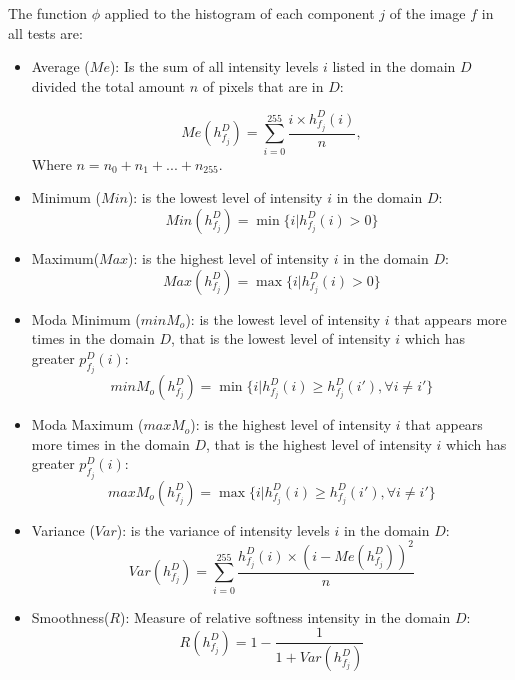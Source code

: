 The function $\phi$ applied to the histogram of each component $j$ of the image $f$ in all tests are:

\begin{itemize}
    \item Average ($Me$): Is the sum of all intensity levels $i$ listed in the domain $D$ divided the total amount $n$ of pixels that are in $D$:
		
\begin{equation}
\label{promedio}
   Me(h_{f_j}^D) = \sum_{i=0}^{255}\frac{i\times h_{f_j}^D(i)}{n},
\end{equation}		
Where $n = n_0 + n_1 + ... + n_{255}$.

    \item Minimum ($Min$): is the lowest level of intensity $i$ in the domain $D$:
\begin{equation}
\label{minimo}
	Min(h_{f_j}^D) = \min\{i|h_{f_j}^D(i)>0\}
\end{equation}		
		\item Maximum($Max$): is the highest level of intensity $i$ in the domain $D$:
\begin{equation}
\label{maximo}
   Max(h_{f_j}^D) = \max\{i|h_{f_j}^D(i)>0\}
\end{equation}		
 		\item Moda Minimum ($minM_o$): is the lowest level of intensity $i$ that appears more times in the domain $D$, that is the lowest level of intensity $i$ which has greater $p_{f_j}^{D}(i)$:
\begin{equation}
\label{ModaMinimo}
   minM_o(h_{f_j}^D) = \min\{i|h_{f_j}^D(i) \geq h_{f_j}^D(i'), \forall i\neq i'\}
\end{equation}		
\item Moda Maximum ($maxM_o$): is the highest level of intensity $i$ that appears more times in the domain $D$, that is the highest level of intensity $i$ which has greater $p_{f_j}^{D}(i)$:
\begin{equation}
\label{ModaMinimo}
   maxM_o(h_{f_j}^D) = \max\{i|h_{f_j}^D(i) \geq h_{f_j}^D(i'), \forall i\neq i'\}
\end{equation}				
    
		
		\item Variance ($Var$): is the variance of intensity levels $i$ in the domain $D$:
  \begin{equation}
\label{varianza}
   Var(h_{f_j}^D) = \sum_{i=0}^{255}\frac{h_{f_j}^D(i)\times(i - Me(h_{f_j}^D))^2}{n}
\end{equation}		
		\item Smoothness($R$): Measure of relative softness intensity in the domain $D$:
 \begin{equation}
\label{Suavidad}
   R(h_{f_j}^D) = 1-\frac{1}{1+Var(h_{f_j}^D)}
\end{equation}		
		

\end{itemize}


